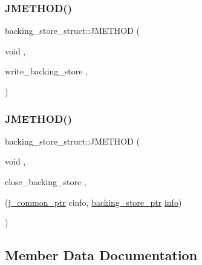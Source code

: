 \subsubsection{\texorpdfstring{JMETHOD()}{JMETHOD()}\hspace{0.1cm}{\footnotesize\ttfamily [2/3]}}
{\footnotesize\ttfamily backing\+\_\+store\+\_\+struct\+::\+J\+M\+E\+T\+H\+OD (\begin{DoxyParamCaption}\item[{void}]{,  }\item[{write\+\_\+backing\+\_\+store}]{,  }\item[{(\mbox{\hyperlink{jpeglib_8h_a1a177ab705cefea8f30ec31a48e62650}{j\+\_\+common\+\_\+ptr}} cinfo, \mbox{\hyperlink{jmemsys_8h_a2e08364903e928910fa9b65ea16c19f9}{backing\+\_\+store\+\_\+ptr}} \mbox{\hyperlink{jmemsys_8h_aae47c0f1d689d6cba5eb7077ca1299fa}{info}}, void \mbox{\hyperlink{jmorecfg_8h_aef060b3456fdcc093a7210a762d5f2ed}{F\+AR}} $\ast$buffer\+\_\+address, long file\+\_\+offset, long byte\+\_\+count)}]{ }\end{DoxyParamCaption})}

\mbox{\label{structbacking__store__struct_a509740a807e120959a02d25ac245eea4}} 
\subsubsection{\texorpdfstring{JMETHOD()}{JMETHOD()}\hspace{0.1cm}{\footnotesize\ttfamily [3/3]}}
{\footnotesize\ttfamily backing\+\_\+store\+\_\+struct\+::\+J\+M\+E\+T\+H\+OD (\begin{DoxyParamCaption}\item[{void}]{,  }\item[{close\+\_\+backing\+\_\+store}]{,  }\item[{(\mbox{\hyperlink{jpeglib_8h_a1a177ab705cefea8f30ec31a48e62650}{j\+\_\+common\+\_\+ptr}} cinfo, \mbox{\hyperlink{jmemsys_8h_a2e08364903e928910fa9b65ea16c19f9}{backing\+\_\+store\+\_\+ptr}} \mbox{\hyperlink{jmemsys_8h_aae47c0f1d689d6cba5eb7077ca1299fa}{info}})}]{ }\end{DoxyParamCaption})}



\subsection{Member Data Documentation}
\mbox{\label{structbacking__store__struct_a90903f2f62f4fe65ac65599b50d0411e}} 
